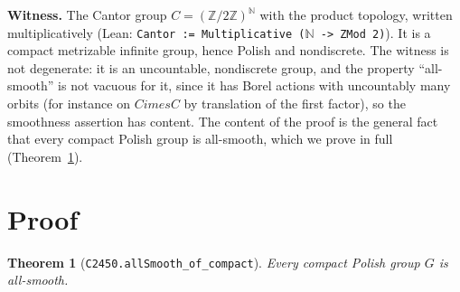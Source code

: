 \documentclass[11pt]{article}
\newtheorem{theorem}{Theorem}
\theoremstyle{definition}
\begin{document}
\textbf{Witness.} The Cantor group $C=(\mathbb Z/2\mathbb Z)^{\mathbb N}$ with the product topology,
written multiplicatively (Lean: \texttt{Cantor := Multiplicative ($\mathbb N$ -> ZMod 2)}). It is a
compact metrizable infinite group, hence Polish and nondiscrete. The witness is not degenerate:
it is an uncountable, nondiscrete group, and the property ``all-smooth'' is not vacuous for it, since
it has Borel actions with uncountably many orbits (for instance on $C	imes C$ by translation of
the first factor), so the smoothness assertion has content. The content of the proof is the general fact that every compact Polish group is
all-smooth, which we prove in full (Theorem~\ref{thm:compact}).

\section{Proof}

\begin{theorem}[\texttt{C2450.allSmooth\_of\_compact}]\label{thm:compact}
Every compact Polish group $G$ is all-smooth.
\end{theorem}
\end{document}
